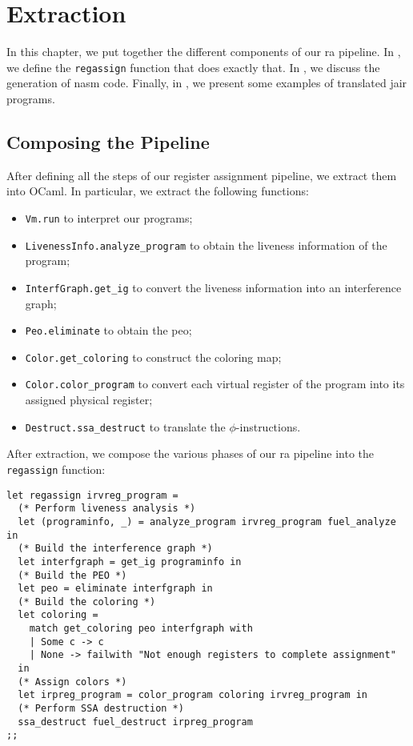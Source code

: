 
\chapter{Extraction}
\label{cha:extraction}

In this chapter, we put together the different components of our \gls{ra} pipeline. In , we define the \texttt{regassign} function that does exactly that. In , we discuss the generation of \gls{nasm} code. Finally, in , we present some examples of translated \gls{jair} programs.

\section{Composing the Pipeline}
\label{sec:pipeline}

After defining all the steps of our register assignment pipeline, we extract them into OCaml.
In particular, we extract the following functions:
\begin{itemize}
  \item \texttt{Vm.run} to interpret our programs;
  \item \texttt{LivenessInfo.analyze\_program} to obtain the liveness information of the program;
  \item \texttt{InterfGraph.get\_ig} to convert the liveness information into an interference graph;
  \item \texttt{Peo.eliminate} to obtain the \gls{peo};
  \item \texttt{Color.get\_coloring} to construct the coloring map;
  \item \texttt{Color.color\_program} to convert each virtual register of the program into its assigned physical register;
  \item \texttt{Destruct.ssa\_destruct} to translate the $\phi$-instructions.
\end{itemize}

After extraction, we compose the various phases of our \gls{ra} pipeline into the \texttt{regassign} function:

\begin{lstlisting}[style=OCaml]
let regassign irvreg_program =
  (* Perform liveness analysis *)
  let (programinfo, _) = analyze_program irvreg_program fuel_analyze in
  (* Build the interference graph *)
  let interfgraph = get_ig programinfo in
  (* Build the PEO *)
  let peo = eliminate interfgraph in
  (* Build the coloring *)
  let coloring =
    match get_coloring peo interfgraph with
    | Some c -> c
    | None -> failwith "Not enough registers to complete assignment"
  in
  (* Assign colors *)
  let irpreg_program = color_program coloring irvreg_program in
  (* Perform SSA destruction *)
  ssa_destruct fuel_destruct irpreg_program
;;
\end{lstlisting}

